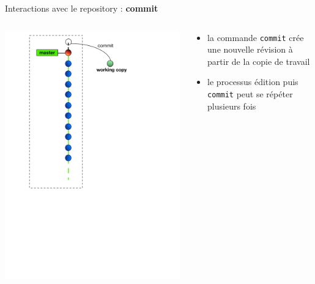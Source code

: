 \begin{frame}[fragile]{%
\protect\hypertarget{interactions-avec-le-repository-commit}{%
Interactions avec le repository : \textbf{commit}}}

\begin{columns}[T]
\begin{column}{0.40\textwidth}
\includegraphics[height=1.5\textwidth]{images/commit.pdf}
\end{column}

\begin{column}{0.60\textwidth}
\begin{itemize}
\tightlist
\item
  la commande \texttt{commit} crée une nouvelle révision à partir de la
  copie de travail
\item
  le processus édition puis \texttt{commit} peut se répéter plusieurs
  fois
\end{itemize}
\end{column}
\end{columns}

\end{frame}

